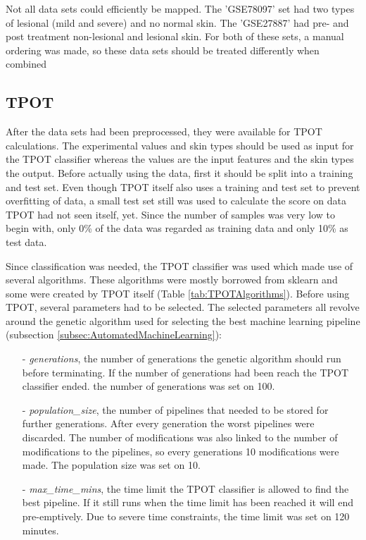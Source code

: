 \documentclass[10pt,a4paper]{article}
\begin{document}
	Not all data sets could efficiently be mapped. The 'GSE78097' set had two types of lesional (mild and severe) and no normal skin. The 'GSE27887' had pre- and post treatment non-lesional and lesional skin. For both of these sets, a manual ordering was made, so these data sets should be treated differently when combined
	
	
	\subsection{TPOT}
	\label{subsec:MethodsTPOT}
	
	After the data sets had been preprocessed, they were available for TPOT calculations. The experimental values and skin types should be used as input for the TPOT classifier whereas the values are the input features and the skin types the output. Before actually using the data, first it should be split into a training and test set. Even though TPOT itself also uses a training and test set to prevent overfitting of data, a small test set still was used to calculate the score on data TPOT had not seen itself, yet. Since the number of samples was very low to begin with, only 0\% of the data was regarded as training data and only 10\% as test data.
	
	 Since classification was needed, the TPOT classifier was used which made use of several algorithms. These algorithms were mostly borrowed from sklearn and some were created by TPOT itself (Table \ref{tab:TPOTAlgorithms}). Before using TPOT, several parameters had to be selected. The selected parameters all revolve around the genetic algorithm used for selecting the best machine learning pipeline (subsection \ref{subsec:AutomatedMachineLearning}):
	 
	 \begin{enumerate}
	 	\item[-] \textit{generations}, the number of generations the genetic algorithm should run before terminating. If the number of generations had been reach the TPOT classifier ended. the number of generations was set on 100.
	 	\item[-] \textit{population\_size}, the number of pipelines that needed to be stored for further generations. After every generation the worst pipelines were discarded. The number of modifications was also linked to the number of modifications to the pipelines, so every generations 10 modifications were made. The population size was set on 10.
	 	\item[-] \textit{max\_time\_mins}, the time limit the TPOT classifier is allowed to find the best pipeline. If it still runs when the time limit has been reached it will end pre-emptively. Due to severe time constraints, the time limit was set on 120 minutes. 
	 \end{enumerate}
	
\end{document}
